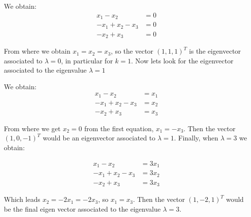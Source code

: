 \documentclass[answers]{exam}
\begin{document}
\begin{questions}
\begin{parts}
\begin{solution}
        We obtain:
        \begin{align*}
            x_1-x_2&=0\\
            -x_1+x_2-x_3&=0\\
            -x_2+x_3&=0
        \end{align*}
        
        From where we obtain $x_1=x_2=x_3$, so the vector $(1,1,1)^T$ is the eigenvector associated to $\lambda=0$, in particular for $k=1$. Now lets look for the eigenvector associated to the eigenvalue $\lambda = 1$
        
            We obtain:
        \begin{align*}
            x_1-x_2&=x_1\\
            -x_1+x_2-x_3&=x_2\\
            -x_2+x_3&=x_3
        \end{align*}
        
        From where we get $x_2=0$ from the first equation, $x_1=-x_3$. Then the vector $(1,0,-1)^T$ would be an eigenvector associated to $\lambda = 1$. Finally, when $\lambda = 3$ we obtain:
        
        \begin{align*}
            x_1-x_2&=3x_1\\
            -x_1+x_2-x_3&=3x_2\\
            -x_2+x_3&=3x_3
        \end{align*}
        
        Which leads $x_2=-2x_1=-2x_3$, so $x_1=x_3$. Then the vector $(1,-2,1)^T$ would be the final eigen vector associated to the eigenvalue $\lambda=3$.
        
    \end{solution}


\end{parts}
\end{questions}
\end{document}
